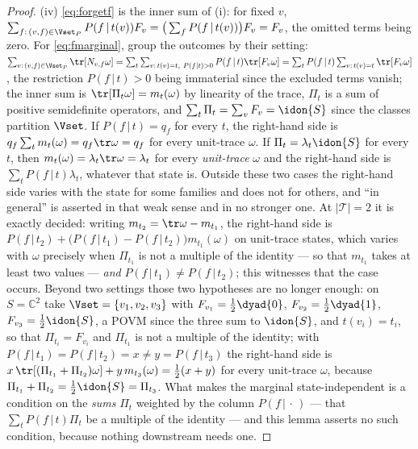 \begin{proof}
(iv) \eqref{eq:forgetf} is the inner sum of (i): for fixed $v$,
$\sum_{f:\,(v,f)\in\Vset_P}P(f\,|\,t(v))F_v=\big(\sum_fP(f\,|\,t(v))\big)F_v
=F_v$, the omitted terms being zero. For \eqref{eq:fmarginal}, group the
outcomes by their setting: $\sum_{v:\,(v,f)\in\Vset_P}\tr[N_{v,f}\omega]
=\sum_{t}\sum_{v:\,t(v)=t,\ P(f|t)>0}P(f\,|\,t)\tr[F_v\omega]
=\sum_tP(f\,|\,t)\sum_{v:\,t(v)=t}\tr[F_v\omega]$, the restriction
$P(f\,|\,t)>0$ being immaterial since the excluded terms vanish; the inner
sum is $\tr[\Pi_t\omega]=m_t(\omega)$ by linearity of the trace, $\Pi_t$ is a
sum of positive semidefinite operators, and $\sum_t\Pi_t=\sum_vF_v=\idon{S}$
since the classes partition $\Vset$. If
$P(f\,|\,t)=q_f$ for every $t$, the right-hand side
is $q_f\sum_tm_t(\omega)=q_f\tr\omega=q_f$ for every unit-trace $\omega$. If
$\Pi_t=\lambda_t\idon{S}$ for every $t$, then $m_t(\omega)=\lambda_t\tr\omega
=\lambda_t$ for every \emph{unit-trace} $\omega$ and the right-hand side is
$\sum_tP(f\,|\,t)\lambda_t$, whatever that state is. Outside these two cases
the right-hand side varies with the state for some families and does not for
others, and ``in general'' is asserted in that weak sense and in no stronger
one. At $|\mathcal{T}|=2$ it is exactly decided: writing
$m_{t_2}=\tr\omega-m_{t_1}$, the right-hand side is
$P(f\,|\,t_2)+\big(P(f\,|\,t_1)-P(f\,|\,t_2)\big)m_{t_1}(\omega)$ on
unit-trace states, which varies with $\omega$ precisely when $\Pi_{t_1}$ is
not a multiple of the identity --- so that $m_{t_1}$ takes at least two
values --- \emph{and} $P(f\,|\,t_1)\ne P(f\,|\,t_2)$; this witnesses that the
case occurs. Beyond two settings those two hypotheses are no longer
enough: on $S=\mathbb{C}^2$ take $\Vset=\{v_1,v_2,v_3\}$ with
$F_{v_1}=\tfrac12\dyad{0}$, $F_{v_2}=\tfrac12\dyad{1}$,
$F_{v_3}=\tfrac12\idon{S}$, a POVM since the three sum to $\idon{S}$, and
$t(v_i)=t_i$, so that $\Pi_{t_i}=F_{v_i}$ and $\Pi_{t_1}$ is not a multiple of
the identity; with $P(f\,|\,t_1)=P(f\,|\,t_2)=x\ne y=P(f\,|\,t_3)$ the
right-hand side is $x\,\tr[(\Pi_{t_1}+\Pi_{t_2})\omega]+y\,m_{t_3}(\omega)
=\tfrac12(x+y)$ for every unit-trace $\omega$, because
$\Pi_{t_1}+\Pi_{t_2}=\tfrac12\idon{S}=\Pi_{t_3}$. What makes the marginal
state-independent is a condition on the \emph{sums} $\Pi_t$ weighted by the
column $P(f\,|\,\cdot\,)$ --- that $\sum_tP(f\,|\,t)\Pi_t$ be a multiple of
the identity --- and this lemma asserts no such condition, because nothing
downstream needs one.
\end{proof}
